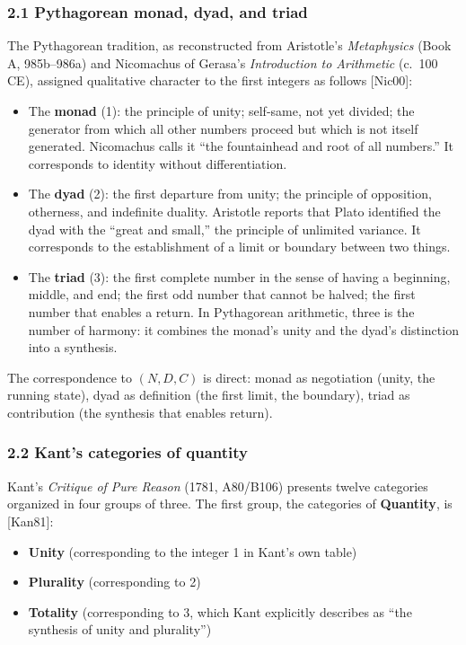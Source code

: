 \documentclass[
  11pt,
  letterpaper,
]{article}
\providecommand{\tightlist}{%
  \setlength{\itemsep}{0pt}\setlength{\parskip}{0pt}}
\begin{document}
\subsubsection{2.1 Pythagorean monad, dyad, and
triad}\label{pythagorean-monad-dyad-and-triad}

The Pythagorean tradition, as reconstructed from Aristotle's
\emph{Metaphysics} (Book A, 985b--986a) and Nicomachus of Gerasa's
\emph{Introduction to Arithmetic} (c.~100 CE), assigned qualitative
character to the first integers as follows {[}Nic00{]}:

\begin{itemize}
\tightlist
\item
  The \textbf{monad} (1): the principle of unity; self-same, not yet
  divided; the generator from which all other numbers proceed but which
  is not itself generated. Nicomachus calls it ``the fountainhead and
  root of all numbers.'' It corresponds to identity without
  differentiation.
\item
  The \textbf{dyad} (2): the first departure from unity; the principle
  of opposition, otherness, and indefinite duality. Aristotle reports
  that Plato identified the dyad with the ``great and small,'' the
  principle of unlimited variance. It corresponds to the establishment
  of a limit or boundary between two things.
\item
  The \textbf{triad} (3): the first complete number in the sense of
  having a beginning, middle, and end; the first odd number that cannot
  be halved; the first number that enables a return. In Pythagorean
  arithmetic, three is the number of harmony: it combines the monad's
  unity and the dyad's distinction into a synthesis.
\end{itemize}

The correspondence to \((N, D, C)\) is direct: monad as negotiation
(unity, the running state), dyad as definition (the first limit, the
boundary), triad as contribution (the synthesis that enables return).

\subsubsection{2.2 Kant's categories of
quantity}\label{kants-categories-of-quantity}

Kant's \emph{Critique of Pure Reason} (1781, A80/B106) presents twelve
categories organized in four groups of three. The first group, the
categories of \textbf{Quantity}, is {[}Kan81{]}:

\begin{itemize}
\tightlist
\item
  \textbf{Unity} (corresponding to the integer 1 in Kant's own table)
\item
  \textbf{Plurality} (corresponding to 2)
\item
  \textbf{Totality} (corresponding to 3, which Kant explicitly describes
  as ``the synthesis of unity and plurality'')
\end{itemize}
\end{document}
